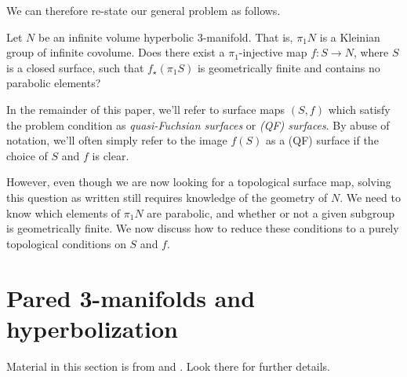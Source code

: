 We can therefore re-state our general problem as follows.

\begin{prob}

Let $N$ be an infinite volume hyperbolic 3-manifold. That is, $\pi_1N$ is
a Kleinian group of infinite covolume. Does there exist a $\pi_1$-injective map
$f \colon S \to N$, where $S$ is a closed surface, such that $f_\star(\pi_1S)$
is geometrically finite and contains no parabolic elements?

\end{prob}

In the remainder of this paper, we'll refer to surface maps $(S,f)$ which
satisfy the problem condition as \emph{quasi-Fuchsian surfaces} or \emph{(QF)
surfaces}. By abuse of notation, we'll often simply refer to the image $f(S)$
as a (QF) surface if the choice of $S$ and $f$ is clear.

However, even though we are now looking for a topological surface map, solving
this question as written still requires knowledge of the geometry of $N$. We
need to know which elements of $\pi_1N$ are parabolic, and whether or not
a given subgroup is geometrically finite. We now discuss how to reduce these
conditions to a purely topological conditions on $S$ and $f$.

\section{Pared 3-manifolds and hyperbolization}

Material in this section is from \cite{Mo} and \cite{CMc}. Look there for
further details.

